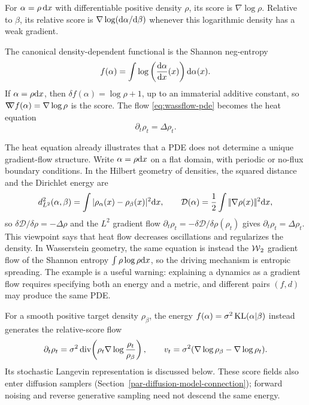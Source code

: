 \begin{defn}\label{def-score-function}
For $\alpha=\rho\,\mathrm{d} x$ with differentiable positive density $\rho$, its score is $\nabla\log\rho$. Relative to $\beta$, its relative score is $\nabla\log(\mathrm{d}\alpha/\mathrm{d}\beta)$ whenever this logarithmic density has a weak gradient.
\end{defn}


The canonical density-dependent functional is the Shannon neg-entropy
   \begin{equation}
       f(\alpha) = \int \log\left(\frac{\mathrm{d} \alpha}{\mathrm{d} x}(x)\right) \mathrm{d} \alpha(x). \label{eq:entropy-func}
   \end{equation}
	   If $\alpha=\rho\mathrm{d} x$, then $\delta f(\alpha) = \log\rho+1$, up to an immaterial additive constant, so $\mathord{\nabla\mkern-9.3mu\nabla} f(\alpha) = \nabla\log\rho$ is the score. The flow \eqref{eq:wassflow-pde} becomes the heat equation
   \begin{equation*}
	       \partial_t \rho_t = \Delta \rho_t.
   \end{equation*}


\begin{rem}\label{rem-two-interpretations-heat-equation}
	The heat equation already illustrates that a PDE does not determine a unique gradient-flow structure. Write $\alpha=\rho\mathrm{d} x$ on a flat domain, with periodic or no-flux boundary conditions. In the Hilbert geometry of densities, the squared distance and the Dirichlet energy are
	\[
		d_{L^2}^2(\alpha,\beta)=\int |\rho_\alpha(x)-\rho_\beta(x)|^2\mathrm{d} x,
		\qquad
		\mathcal D(\alpha)=\frac12\int |\!| \nabla\rho(x) |\!|^2\mathrm{d} x,
	\]
	so $\delta\mathcal D/\delta\rho=-\Delta\rho$ and the $L^2$ gradient flow $\partial_t\rho_t=-\delta\mathcal D/\delta\rho(\rho_t)$ gives $\partial_t\rho_t=\Delta\rho_t$. This viewpoint says that heat flow decreases oscillations and regularizes the density. In Wasserstein geometry, the same equation is instead the $\operatorname{\mathcal{W}}_2$ gradient flow of the Shannon entropy $\int \rho\log\rho\mathrm{d} x$, so the driving mechanism is entropic spreading. The example is a useful warning: explaining a dynamics as a gradient flow requires specifying both an energy and a metric, and different pairs $(f,d)$ may produce the same PDE.
\end{rem}
For a smooth positive target density $\rho_\beta$, the energy $f(\alpha)=\sigma^2\operatorname{KL}(\alpha|\beta)$ instead generates the relative-score flow
\begin{equation}\label{eq-relative-entropy-three-representations}
 \partial_t\rho_t=\sigma^2\operatorname{div}\!\left(\rho_t\nabla\log\frac{\rho_t}{\rho_\beta}\right),
 \qquad v_t=\sigma^2(\nabla\log\rho_\beta-\nabla\log\rho_t).
\end{equation}
Its stochastic Langevin representation is discussed below. These score fields also enter diffusion samplers (Section~\ref{par-diffusion-model-connection}); forward noising and reverse generative sampling need not descend the same energy.

